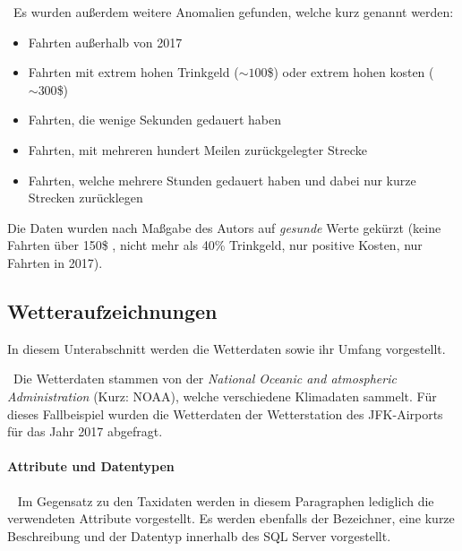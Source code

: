 ~\newline Es wurden außerdem weitere Anomalien gefunden, welche kurz genannt werden:
\begin{itemize}
	\item Fahrten außerhalb von 2017
	\item Fahrten mit extrem hohen Trinkgeld ($\sim 100$\$) oder extrem hohen kosten ($\sim300$\$)
	\item Fahrten, die wenige Sekunden gedauert haben
	\item Fahrten, mit mehreren hundert Meilen zurückgelegter Strecke
	\item Fahrten, welche mehrere Stunden gedauert haben und dabei nur kurze Strecken zurücklegen
\end{itemize}

Die Daten wurden nach Maßgabe des Autors auf \textit{gesunde} Werte gekürzt (keine Fahrten über 150\$ , nicht mehr als 40\% Trinkgeld, nur positive Kosten, nur Fahrten in 2017).
\subsection{Wetteraufzeichnungen}
\label{subsec:Wetterdaten}
In diesem Unterabschnitt werden die Wetterdaten sowie ihr Umfang vorgestellt. 

~\newline Die Wetterdaten stammen von der \textit{National Oceanic and atmospheric Administration} \cite{SourceWeather} (Kurz: NOAA), welche verschiedene Klimadaten sammelt. Für dieses Fallbeispiel wurden die Wetterdaten der Wetterstation des JFK-Airports für das Jahr 2017 abgefragt. 

\paragraph{Attribute und Datentypen} ~\newline
Im Gegensatz zu den Taxidaten werden in diesem Paragraphen lediglich die verwendeten Attribute vorgestellt. Es werden ebenfalls der Bezeichner, eine kurze Beschreibung und der Datentyp innerhalb des SQL Server vorgestellt. 

